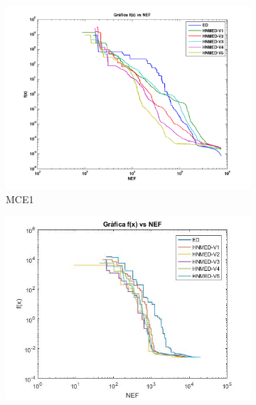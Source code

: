 \begin{table}
{\begin{tabular}{clcccccc}
			
			
			
			
			
			
		\end{tabular}
	}
\end{table}


\begin{figure}
	\centering
	\begin{subfigure}[b]{0.49\linewidth}
		\includegraphics[width=\linewidth]{Figures/Grafica_Convergencia_Problema_1}
		\caption{MCE1} \label{fig:M1} 
	\end{subfigure}
	\begin{subfigure}[b]{0.49\linewidth}
		\includegraphics[width=\textwidth]{Figures/Grafica_Convergencia_Problema_2}

\end{subfigure}
\end{figure}
